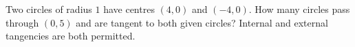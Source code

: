 Two circles of radius $1$ have centres $(4,0)$ and $(-4,0)$. How many circles pass through $(0,5)$ and are tangent to both given circles? Internal and external tangencies are both permitted.
